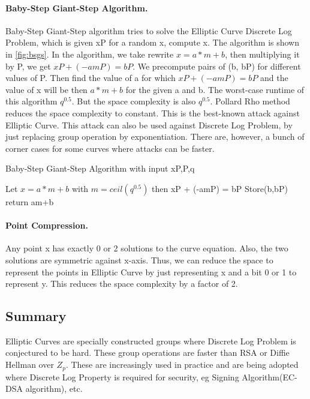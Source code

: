 \paragraph{Baby-Step Giant-Step Algorithm.} Baby-Step Giant-Step algorithm tries to solve the Elliptic Curve Discrete Log Problem, which is given xP for a random x, compute x. The algorithm is shown in \ref{fig:bsgs}. In the algorithm, we take rewrite $x = a*m+b$, then multiplying it by P, we get $xP + (-amP) = bP$. We precompute pairs of (b, bP) for different values of P. Then find the value of a for which $xP + (-amP) = bP$ and the value of x will be then $a*m+b$ for the given a and b. The worst-case runtime of this algorithm $q^{0.5}$. But the space complexity is also $q^{0.5}$. Pollard Rho method reduces the space complexity to constant. This is the best-known attack against Elliptic Curve. This attack can also be used against Discrete Log Problem, by just replacing group operation by exponentiation. There are, however, a bunch of corner cases for some curves where attacks can be faster.


\begin{algorithm}
\caption{Baby-Step Giant-Step Algorithm with input xP,P,q }\label{fig:bsg}
\begin{algorithmic}[1]
\State Let $x = a*m+b$ with $m = ceil(q^{0.5})$ then
\State xP + (-amP) = bP
\State Store(b,bP)
\EndFor
{}
\State return am+b
\EndIf
\EndFor
\EndProcedure
\end{algorithmic}
\end{algorithm}

\paragraph{Point Compression.} Any point x has exactly 0 or 2 solutions to the curve equation. Also, the two solutions are symmetric against x-axis. Thus, we can reduce the space to represent the points in Elliptic Curve by just representing x and a bit 0 or 1 to represent y. This reduces the space complexity by a factor of 2.

\subsection{Summary}
Elliptic Curves are specially constructed groups where Discrete Log Problem is conjectured to be hard. These group operations are faster than RSA or Diffie Hellman over $Z_p$. These are increasingly used in practice and are being adopted where Discrete Log Property is required for security, eg Signing Algorithm(EC-DSA algorithm), etc.
